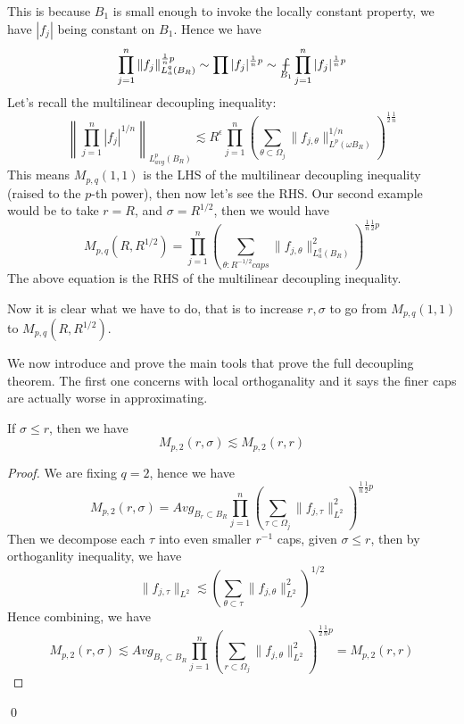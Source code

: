This is because $B_1$ is small enough to invoke the locally constant property, we have $|f_j|$ being constant on $B_1$. Hence we have
\begin{equation*}
    \prod_{j=1}^n\|f_j\|_{L_a^q(B_R)}^{\frac{1}{n}p}\sim\prod |f_j|^{\frac{1}{n}p}\sim\avint_{B_1}\prod_{j=1}^n|f_j|^{\frac{1}{n}p}
\end{equation*}
Let's recall the multilinear decoupling inequality:
\begin{equation*}
    \left\|\prod_{j=1}^n|f_j|^{1/n} \right\|_{L_{avg}^p(B_R)}\lesssim R^\epsilon\prod_{j=1}^n\left(\sum_{\theta\subset\Omega_j}\|f_{j,\theta}\|_{L^p(\omega B_R)}^{1/n} \right)^{\frac{1}{2}\frac{1}{n}}
\end{equation*}
This means $M_{p,q}(1,1)$ is the LHS of the multilinear decoupling inequality (raised to the $p$-th power), then now let's see the RHS. Our second example would be to take $r=R$, and $\sigma=R^{1/2}$, then we would have
\begin{equation*}
    M_{p,q}(R,R^{1/2})=\prod_{j=1}^n\left(\sum_{\theta:R^{-1/2}caps}\|f_{j,\theta}\|_{L_a^q(B_R)}^2 \right)^{\frac{1}{n}\frac{1}{2}p}
\end{equation*}
The above equation is the RHS of the multilinear decoupling inequality.

Now it is clear what we have to do, that is to increase $r,\sigma$ to go from $M_{p,q}(1,1)$ to $M_{p,q}(R, R^{1/2})$.

We now introduce and prove the main tools that prove the full decoupling theorem. The first one concerns with local orthoganality and it says the finer caps are actually worse in approximating.
\begin{lemma}[Orthoganlity]
    If $\sigma\leq r$, then we have
    \begin{equation*}
        M_{p,2}(r,\sigma)\lesssim M_{p,2}(r,r)
    \end{equation*}
\end{lemma}
\begin{proof}
    We are fixing $q=2$, hence we have
    \begin{equation*}
        M_{p,2}(r,\sigma)=Avg_{B_r\subset B_R}\prod_{j=1}^n\left(\sum_{\tau\subset\Omega_j}\|f_{j,\tau}\|_{L^2}^2\right)^{\frac{1}{n}\frac{1}{2}p}
    \end{equation*}
    Then we decompose each $\tau$ into even smaller $r^{-1}$ caps, given $\sigma\leq r$, then by orthoganlity inequality, we have
    \begin{equation*}
        \|f_{j,\tau}\|_{L^2}\lesssim \left(\sum_{\theta\subset\tau}\|f_{j,\theta}\|_{L^2}^2 \right)^{1/2}
    \end{equation*}
    Hence combining, we have
    \begin{equation*}
        M_{p,2}(r,\sigma)\lesssim Avg_{B_r\subset B_R}\prod_{j=1}^n\left(\sum_{r\subset\Omega_j}\|f_{j,\theta}\|_{L^2}^2 \right)^{\frac{1}{2}\frac{1}{n}p}=M_{p,2}(r,r)
    \end{equation*}
\end{proof}
\qed


